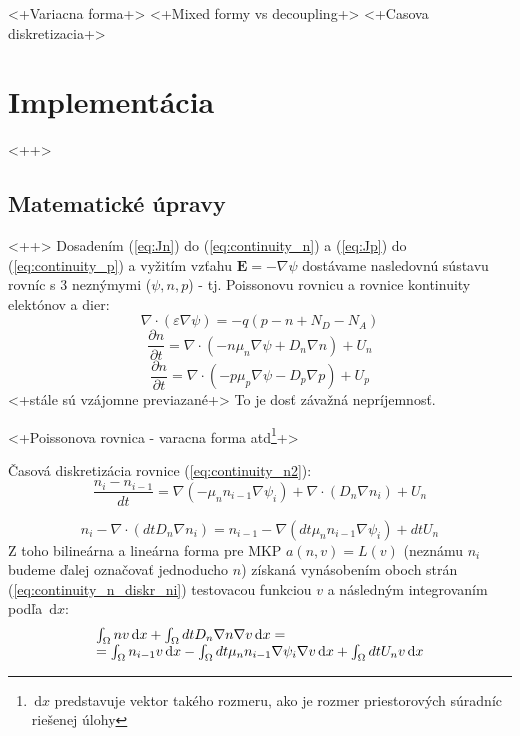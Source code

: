 \documentclass[a4paper, twoside, 12pt, onecolumn]{article}
\newcommand{\dif}{\, \mathrm{d}}	%
\newcommand{\dxdtp}[2]{\frac{\partial #1}{\partial #2}}
\begin{document}
<+Variacna forma+>
<+Mixed formy vs decoupling+>
<+Casova diskretizacia+>

\section{Implementácia}<++>
\subsection{Matematické úpravy}\label{ch:implementacia__matematicke_upravy}<++>
Dosadením (\ref{eq:Jn}) do (\ref{eq:continuity_n}) a (\ref{eq:Jp}) do (\ref{eq:continuity_p}) a vyžitím vzťahu $\mathbf{E} = - \nabla \psi$ dostávame nasledovnú sústavu rovníc s 3 neznýmymi ($\psi, n, p$) - tj. Poissonovu rovnicu a rovnice kontinuity elektónov a dier:
\begin{equation}
	\nabla \cdot (\varepsilon \nabla \psi) = -q (p -n + N_D - N_A)
	\label{eq:poisson2}
\end{equation}
\begin{equation}
	\dxdtp{n}{t} = \nabla \cdot (-n \mu_n \nabla \psi + D_n \nabla n) + U_n
	\label{eq:continuity_n2}
\end{equation}
\begin{equation}
	\dxdtp{n}{t} = \nabla \cdot (-p \mu_p \nabla \psi - D_p \nabla p) + U_p
	\label{eq:continuity_p2}
\end{equation}
<+stále sú vzájomne previazané+> To je dosť závažná nepríjemnosť.

<+Poissonova rovnica - varacna forma atd\footnote{$\dif{x}$ predstavuje vektor takého rozmeru, ako je rozmer priestorových súradníc riešenej úlohy}+>

Časová diskretizácia rovnice (\ref{eq:continuity_n2}):
\begin{equation}
	\frac{n_{i} - n_{i-1}}{dt} = \nabla (-\mu_n n_{i-1} \nabla \psi_i) + \nabla \cdot \left( D_n \nabla n_i \right) + U_n
	\label{eq:continuity_n_diskr}
\end{equation}

\begin{equation}
	n_i - \nabla \cdot (dt D_n \nabla n_i) = n_{i-1} - \nabla (dt \mu_n n_{i-1} \nabla \psi_i) + dt U_n			
	\label{eq:continuity_n_diskr_ni}
\end{equation}
Z toho bilineárna a lineárna forma pre MKP $a(n, v) = L(v)$ (neznámu $n_i$ budeme ďalej označovať jednoducho $n$) získaná vynásobením oboch strán (\ref{eq:continuity_n_diskr_ni}) testovacou funkciou $v$ a následným integrovaním podľa $\dif{x}$:
\begin{equation}
	\begin{array}{l l}
		\int_{\Omega} n v \dif x + \int_{\Omega} dt D_n \nabla n \nabla v \dif x
		=\\
		= \int_{\Omega} n_{i-1} v \dif x - \int_{\Omega}dt \mu_n n_{i-1} \nabla \psi_i \nabla v \dif x + \int_{\Omega} dt U_n v \dif x
	\end{array}
	\label{eq:continuity_n_a_L}
\end{equation}
\end{document}
